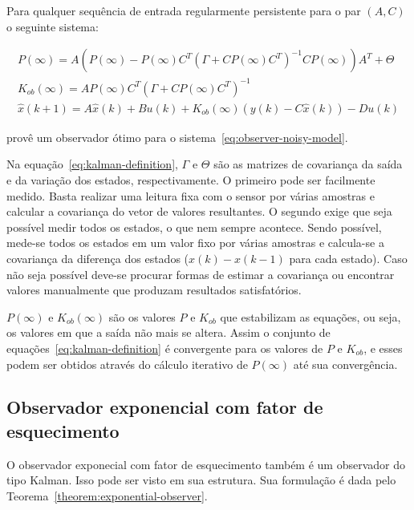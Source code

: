 \begin{theorem}%
	\label{theorem:kalman}
	Para qualquer sequência de entrada regularmente persistente para o par \(
	(A, C) \) o seguinte sistema:

	\begin{equation}
		\label{eq:kalman-definition}
		\begin{split}
			P(\infty)=A(P(\infty)-P(\infty)C^T{(\Gamma+CP(\infty)C^T)}^{-1}CP(\infty))A^T+\Theta \\
			K_{ob}(\infty)=AP(\infty)C^T{(\Gamma+CP(\infty)C^T)}^{-1} \\
			\hat{x}(k+1) = A\hat{x}(k) + Bu(k) + K_{ob}(\infty)(y(k) - C\hat{x}(k))-Du(k)
		\end{split}
	\end{equation}

	provê um observador  ótimo para o sistema~\eqref{eq:observer-noisy-model}.
\end{theorem}

Na equação~\eqref{eq:kalman-definition}, \( \Gamma \) e \( \Theta \) são as
matrizes de covariança da saída e da variação dos estados, respectivamente. O
primeiro pode ser facilmente medido. Basta realizar uma leitura fixa com o
sensor por várias amostras e calcular a covariança do vetor de valores
resultantes. O segundo exige que seja possível medir todos os estados, o que nem
sempre acontece. Sendo possível, mede-se todos os estados em um valor fixo por
várias amostras e calcula-se a covariança da diferença dos estados (\( x(k) -
x(k-1) \) para cada estado). Caso não seja possível deve-se procurar formas de
estimar a covariança ou encontrar valores manualmente que produzam resultados
satisfatórios.

\( P(\infty) \) e \( K_{ob}(\infty) \) são os valores \( P \) e \( K_{ob} \) que
estabilizam as equações, ou seja, os valores em que a saída não mais se altera.
Assim o conjunto de equações~\eqref{eq:kalman-definition} é convergente para os
valores de \( P \) e \( K_{ob} \), e esses podem ser obtidos através do cálculo
iterativo de \( P(\infty) \) até sua convergência.

\subsection{Observador exponencial com fator de esquecimento}%
\label{subsec:exponential-observer}

O observador exponecial com fator de esquecimento\cite{Ticlea2009} também é um
observador do tipo Kalman. Isso pode ser visto em sua estrutura. Sua formulação
é dada pelo Teorema~\ref{theorem:exponential-observer}.

